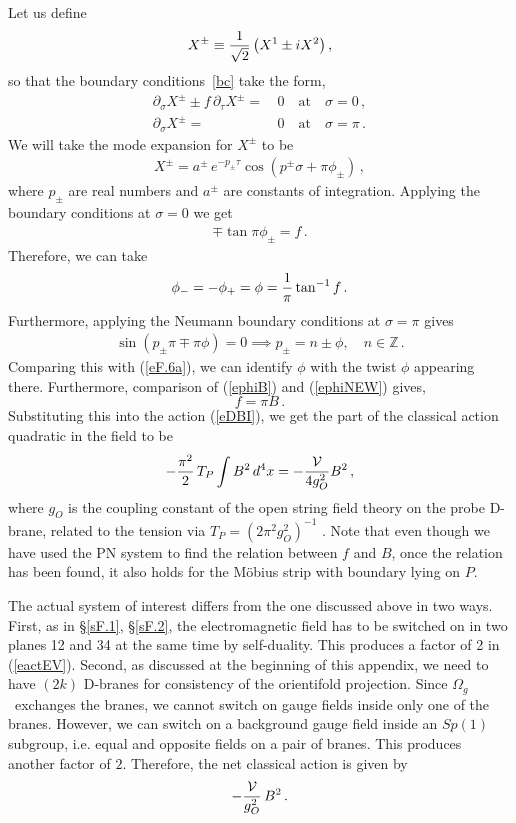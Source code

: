\documentclass[12pt,a4paper]{article}
\newcommand{\be}{\begin{equation}}
\newcommand{\ee}{\end{equation}}
\newcommand{\refb}[1]{(\ref{#1})}
\newcommand{\VV}{{\cal V}}
\newcommand{\oo}{{$\Omega_g$}}
\begin{document}
Let us define
\begin{align}
X^\pm \equiv {1 \over \sqrt{2} } \left(X^1 \pm i X^2 \right) ,
\end{align}
so that the boundary conditions~\eqref{bc}  take the form,
\be
\begin{split}
\partial_\sigma X^\pm \pm f \,  \partial_\tau X^\pm  = &\, 0\quad  \text{at} \quad \sigma =0\, ,
\\
\partial_\sigma X^\pm= &\, 0 \quad  \text{at} \quad \sigma =\pi \, .
\end{split}
\ee
We will take the mode expansion for $X^{\pm}$ to be
\begin{align}
X^\pm = a^\pm \, e^{-p_\pm\tau} \cos(p^\pm \sigma + \pi \phi_\pm)\, ,
\end{align}
where $p_\pm$ are real numbers and $a^\pm$ are constants of integration.
Applying the boundary conditions at $\sigma = 0$ we get
\begin{align}
\mp \tan \pi \phi_\pm = f \, .
\end{align}
Therefore, we can take
\be\label{ephiNEW}
\phi_-=-\phi_+=\phi={1\over \pi} \tan^{-1}f\, .
\ee
Furthermore, applying the Neumann boundary conditions at $\sigma = \pi$ gives
\begin{align}
\sin(p_\pm \pi \mp \pi \phi) = 0 \implies p_\pm =n\pm \phi, \quad n \in \mathbb{Z} \, .
\end{align}
Comparing this with \refb{eF.6a}, we can identify
$\phi$ with the twist $\phi$ appearing there. Furthermore, comparison of
\refb{ephiB} and \refb{ephiNEW} gives,
\be \label{eprecisenorm}
f = \pi B\, .
\ee
Substituting this into the action \refb{eDBI}, we get the  part of the
classical action quadratic in the field to be
\be\label{eactEV}
-{\pi^2\over 2} \, T_P\int B^2 \, d^4 x= -{\VV\over 4 g_O^2}  B^2 \, ,
\ee
where $g_O$ is the coupling constant
of the open string field theory on the probe D-brane,
related to the tension via $T_P=(2\pi^2 g_O^2)^{-1}$ \cite{Sen:1999xm}.
Note that even though we have used the PN system to find the relation between $f$ and
$B$, once the relation has been found, it also holds for the M\"{o}bius strip with boundary
lying on $P$.

The actual system of interest
differs from the one discussed above in two ways.
First, as in \S\ref{sF.1}, \S\ref{sF.2}, the electromagnetic field has to be switched
on in two planes 12 and 34 at the same time by self-duality. This produces a factor of 2 in \refb{eactEV}. Second,
as discussed at the beginning of this appendix, we
need to have $(2k)$  D-branes for consistency of the orientifold projection.
Since \oo\ exchanges the branes, we cannot switch on gauge fields
inside only one of the branes. However, we can switch on a background gauge
field inside an $Sp(1)$ subgroup, i.e. equal and opposite fields on a pair of branes.
This produces another factor of $2$. Therefore, the
net classical action is given by
\be \label{eCLASS}
-{\VV\over g_O^2} \,  B^2 \, .
\ee
\end{document}
